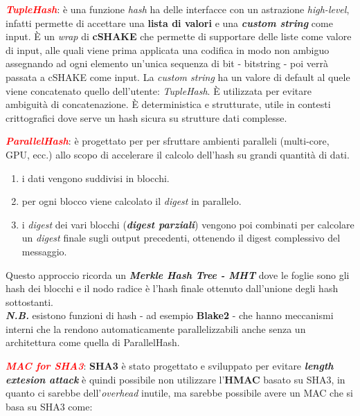 \begin{flushleft}
    \smallskip

    \textcolor{red}{\textbf{\textit{TupleHash}}}: è una funzione \textit{hash} ha delle interfacce con un astrazione \textit{high-level}, infatti permette di accettare una \textbf{lista di valori} e una \textbf{\textit{custom string}} come input. È un \textit{wrap} di \textbf{cSHAKE} che permette di supportare delle liste come valore di input, alle quali viene prima applicata una codifica in modo non ambiguo assegnando ad ogni elemento un'unica sequenza di bit - bitstring - poi verrà passata a cSHAKE come input. La \textit{custom string} ha un valore di default al quele viene concatenato quello dell'utente: \textit{TupleHash}. È utilizzata per evitare ambiguità di concatenazione. È deterministica e strutturate, utile in contesti crittografici dove serve un hash sicura su strutture dati complesse.

    \smallskip

    \textcolor{red}{\textbf{\textit{ParallelHash}}}: è progettato per per sfruttare ambienti paralleli (multi-core, GPU, ecc.) allo scopo di accelerare il calcolo dell'hash su grandi quantità di dati.
    \begin{enumerate}[nosep]
        \item i dati vengono suddivisi in blocchi.
        \item per ogni blocco viene calcolato il \textit{digest} in parallelo.
        \item i \textit{digest} dei vari blocchi (\textbf{\textit{digest parziali}}) vengono poi combinati per calcolare un \textit{digest} finale sugli output precedenti, ottenendo il digest complessivo del messaggio.
    \end{enumerate}
    Questo approccio ricorda un \textbf{\textit{Merkle Hash Tree - MHT}} dove le foglie sono gli hash dei blocchi e il nodo radice è l'hash finale ottenuto dall'unione degli hash sottostanti. \\ 
    \textbf{\textit{N.B.}} esistono funzioni di hash - ad esempio \textbf{Blake2} - che hanno meccanismi interni che la rendono automaticamente parallelizzabili anche senza un architettura come quella di ParallelHash.

    \smallskip

    \textcolor{red}{\textbf{\textit{MAC for SHA3}}}: \textbf{SHA3} è stato progettato e sviluppato per evitare \textbf{\textit{length extesion attack}} è quindi possibile non utilizzare l'\textbf{HMAC} basato su SHA3, in quanto ci sarebbe dell'\textit{overhead} inutile, ma sarebbe possibile avere un MAC che si basa su SHA3 come:


\end{flushleft}
